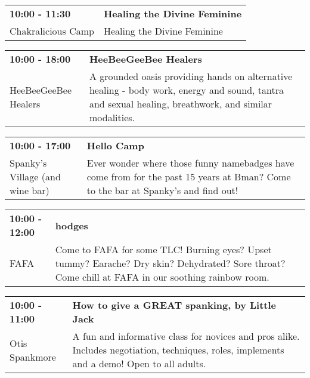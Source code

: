\begin{tabular}{ p{1in} p{2.2in} }
    \textbf{10:00 - 11:30} & \textbf{Healing the Divine Feminine} \\
    Chakralicious Camp \newline  & Healing the Divine Feminine \\
    \hline 
\end{tabular}
    
\begin{tabular}{ p{1in} p{2.2in} }
    \textbf{10:00 - 18:00} & \textbf{HeeBeeGeeBee Healers} \\
    HeeBeeGeeBee Healers \newline  & A grounded oasis providing hands on alternative healing - body work, energy and sound, tantra and sexual healing, breathwork, and similar modalities. \\
    \hline 
\end{tabular}
    
\begin{tabular}{ p{1in} p{2.2in} }
    \textbf{10:00 - 17:00} & \textbf{Hello Camp} \\
    Spanky's Village (and wine bar) \newline  & Ever wonder where those funny namebadges have come from for the past 15 years at Bman?  Come to the bar at Spanky's and find out! \\
    \hline 
\end{tabular}
    
\begin{tabular}{ p{1in} p{2.2in} }
    \textbf{10:00 - 12:00} & \textbf{hodges} \\
    FAFA \newline  & Come to FAFA for some TLC! Burning eyes? Upset tummy? Earache? Dry skin? Dehydrated? Sore throat? Come chill at FAFA in our soothing rainbow room. \\
    \hline 
\end{tabular}
    
\begin{tabular}{ p{1in} p{2.2in} }
    \textbf{10:00 - 11:00} & \textbf{How to give a GREAT spanking, by Little Jack} \\
    Otis Spankmore \newline  & A fun and informative class for novices and pros alike. Includes negotiation, techniques, roles, implements and a demo! Open to all adults. \\
    \hline 
\end{tabular}
    
